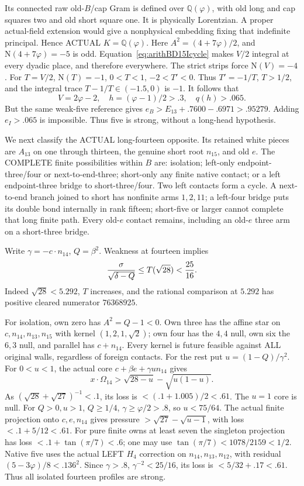 \documentclass[11pt]{article}
\begin{document}
Its connected raw old-\(B\)/cap Gram is defined over
\(\mathbb Q(\varphi)\), with old long and cap squares
two and old short square one.
It is physically Lorentzian.
A proper actual-field extension would give a
nonphysical embedding fixing that indefinite principal.
Hence ACTUAL \(K=\mathbb Q(\varphi)\).
Here \(A^2=(4+7\varphi)/2\), and
\(\mathrm N(4+7\varphi)=-5\) is odd.
Equation~\eqref{eq:arithBD15Icycle} makes \(V/2\)
integral at every dyadic place, and therefore everywhere.
The strict strips force
\(\mathrm N(V)=-4\).
For \(T=V/2\), \(\mathrm N(T)=-1\), \(0<T<1\),
\(-2<T'<0\).
Thus \(T'=-1/T\), \(T>1/2\), and the integral trace
\(T-1/T\in(-1.5,0)\) is \(-1\).
It follows that
\[
          V=2\varphi-2,\quad h=(\varphi-1)/2>.3,\quad
          q(h)>.065 .
\]
But the same weak-five reference gives
\(e_B>E_{13}+.7600-.6971>.95279\).
Adding \(e_I>.065\) is impossible.
Thus five is strong, without a long-head hypothesis.

We next classify the ACTUAL long-fourteen opposite.
Its retained white pieces are \(A_{13}\) on one
through thirteen, the genuine short root \(n_{15}\),
and old \(e\).
The COMPLETE finite possibilities within \(B\) are:
isolation; left-only endpoint-three/four or next-to-end-three;
short-only any finite native contact;
or a left endpoint-three bridge to short-three/four.
Two left contacts form a cycle.
A next-to-end branch joined to short has nonfinite
arms \(1,2,11\); a left-four bridge puts its double
bond internally in rank fifteen; short-five or larger
cannot complete that long finite path.
Every old-\(e\) contact remains, including an old-\(e\)
three arm on a short-three bridge.

Write \(\gamma=-c\cdot n_{14}\), \(Q=\beta^2\).
Weakness at fourteen implies
\[
 {\sigma\over\sqrt{\delta-Q}}\le T(\sqrt{28})<{25\over16}.
\]
Indeed \(\sqrt{28}<5.292\), \(T\) increases,
and the rational comparison at \(5.292\) has positive
cleared numerator \(76368925\).

For isolation, own zero has \(A^2=Q-1<0\).
Own three has the affine star on \(c,n_{14},n_{13},n_{15}\)
with kernel \((1,2,1,\sqrt2)\);
own four has the \(4,4\) null, own six the \(6,3\)
null, and parallel has \(c+n_{14}\).
Every kernel is future feasible against ALL original
walls, regardless of foreign contacts.
For the rest put \(u=(1-Q)/\gamma^2\).
For \(0<u<1\), the actual core
\(c+\beta e+\gamma u n_{14}\) gives
\[
 x\cdot\Omega_{14}>
          \sqrt{28-u}-\sqrt{u(1-u)}.
\]
As \((\sqrt{28}+\sqrt{27})^{-1}<.1\), its loss is
\(<(.1+1.005)/2<.61\).
The \(u=1\) core is null.
For \(Q>0,u>1\), \(Q\ge1/4\),
\(\gamma\ge\varphi/2>.8\), so \(u<75/64\).
The actual finite projection onto \(c,e,n_{14}\)
gives pressure \(>\sqrt{27}-\sqrt{u-1}\),
with loss \(<.1+5/12<.61\).
For pure finite owns at least seven the singleton
projection has loss \(<.1+\tan(\pi/7)<.6\);
one may use \(\tan(\pi/7)<1078/2159<1/2\).
Native five uses the actual LEFT \(H_4\) correction on
\(n_{14},n_{13},n_{12}\), with residual
\((5-3\varphi)/8<.136^2\).
Since \(\gamma>.8\), \(\gamma^{-2}<25/16\),
its loss is \(<5/32+.17<.61\).
Thus all isolated fourteen profiles are strong.
\end{document}
